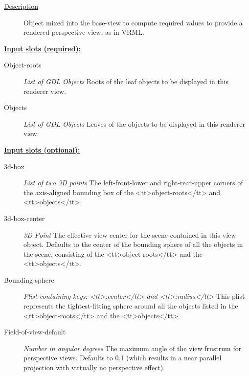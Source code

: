 \documentclass [11pt]{book}
\begin{document}
\begin{itemize}
\begin{description}
\item [
\underline{Description}]


Object mixed into the base-view to compute required values to provide
a rendered perspective view, as in VRML.



\end{description}








\textbf{
\underline{Input slots (required):}}

\begin{description}

\item [Object-roots]
\emph{List of GDL Objects} Roots of the leaf objects to be displayed in this renderer view.


\item [Objects]
\emph{List of GDL Objects} Leaves of the objects to be displayed in this renderer view.


\end{description}






\textbf{
\underline{Input slots (optional):}}

\begin{description}

\item [3d-box]
\emph{List of two 3D points} The left-front-lower and right-rear-upper corners of the axis-aligned bounding
box of the <tt>object-roots</tt> and <tt>objects</tt>.


\item [3d-box-center]
\emph{3D Point} The effective view center for the scene contained in this view object. Defaults to the center of the bounding sphere of all
the objects in the scene, consisting of the <tt>object-roots</tt> and the <tt>objects</tt>.


\item [Bounding-sphere]
\emph{Plist containing keys: <tt>:center</tt> and <tt>:radius</tt>} This plist represents the tightest-fitting sphere
around all the objects listed in the <tt>object-roots</tt> and the <tt>objects</tt>


\item [Field-of-view-default]
\emph{Number in angular degrees} The maximum angle of the view frustrum for perspective views.
Defaults to 0.1 (which results in a near parallel projection with virtually no perspective effect).



\end{description}
\end{itemize}
\end{document}
